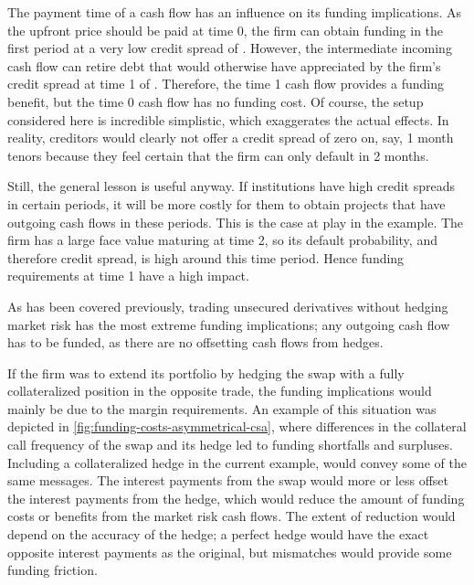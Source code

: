 \documentclass[main.tex]{subfiles}
\begin{document}
        The payment time of a cash flow has an influence on its funding implications.
        As the upfront price should be paid at time 0, 
        the firm can obtain funding in the first period at a very low credit spread of .
        However, the intermediate incoming cash flow can retire debt
        that would otherwise have appreciated 
        by the firm's credit spread at time 1 of .
        Therefore, the time 1 cash flow provides a funding benefit,
        but the time 0 cash flow has no funding cost.
        Of course, the setup considered here is incredible simplistic,
        which exaggerates the actual effects.
        In reality, creditors would clearly not offer a credit spread of zero on, say,
        1 month tenors because they feel certain that the firm can only default in 2 months.

        Still, the general lesson is useful anyway.
        If institutions have high credit spreads in certain periods,
        it will be more costly for them to obtain projects 
        that have outgoing cash flows in these periods.
        This is the case at play in the example.
        The firm has a large face value maturing at time 2, 
        so its default probability, and therefore credit spread,
        is high around this time period.
        Hence funding requirements at time 1 have a high impact.

        As has been covered previously, trading unsecured derivatives without hedging market risk
        has the most extreme funding implications;
        any outgoing cash flow has to be funded, 
        as there are no offsetting cash flows from hedges.

        If the firm was to extend its portfolio by hedging the swap
        with a fully collateralized position in the opposite trade,
        the funding implications would mainly be due to the margin requirements.
        An example of this situation was depicted in \cref{fig:funding-costs-asymmetrical-csa},
        where differences in the collateral call frequency of the swap and its hedge
        led to funding shortfalls and surpluses.
        Including a collateralized hedge in the current example, would convey some of the same messages.
        The interest payments from the swap would more or less 
        offset the interest payments from the hedge, 
        which would reduce the amount of funding costs or benefits from the market risk cash flows.
        The extent of reduction would depend on the accuracy of the hedge;
        a perfect hedge would have the exact opposite interest payments as the original,
        but mismatches would provide some funding friction.
        
\end{document}
